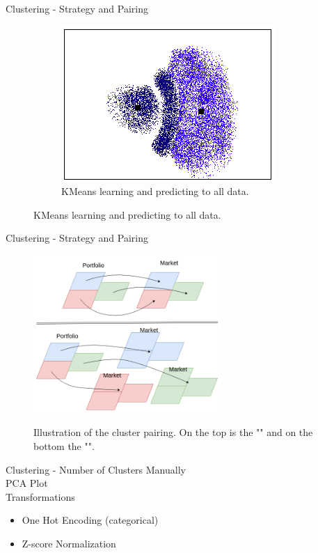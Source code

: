 
\begin{frame}{Clustering - Strategy and Pairing}
    \begin{figure}
        \centering
        \caption{Example of \fullNameClusterStrategyB{}} \pause
        \begin{subfigure}{\textwidth}
            \centering
            \includegraphics[width=0.5\linewidth]{fig/ch3-cluster-strategy-all.png}
            \caption{KMeans learning and predicting to all data.}
            \label{fig:sub3}
        \end{subfigure}
    \end{figure}
\end{frame}


\begin{frame}{Clustering - Strategy and Pairing}
    \begin{figure}
        \centering
        \caption{Illustration of the cluster pairing. On the top is the "\fullNameClusterPairingA{}" and on the bottom the "\fullNameClusterPairingB{}".}       \includegraphics[height=6cm]{fig/ch3-cluster-pairing.png}
        \label{fig:cluster-pairing}
    \end{figure}
\end{frame}


\begin{frame}{Clustering - Number of Clusters} \pause
    Manually \\  \pause
    \vspace{0.5cm}
    PCA Plot \\ \pause
    \vspace{0.5cm}
    Transformations \\ \pause
        \begin{itemize}
            \item One Hot Encoding (categorical) \pause
            \item Z-score Normalization 
        \end{itemize}
\end{frame}

